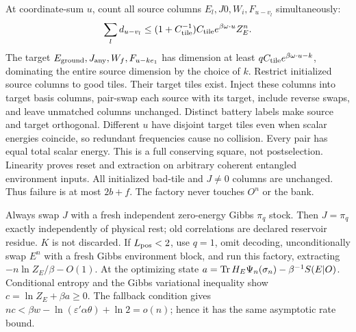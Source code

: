 At coordinate-sum $u$, count all source columns
$E_l,J0,W_i,F_{u-v_l}$ simultaneously:
\[
 \sum_l d_{u-v_l}
 \le(1+C_{\rm tile}^{-1})C_{\rm tile}e^{\beta\omega\cdot u}Z_E^n.
\]
The target $E_{\rm ground},J_{\rm any},W_f,F_{u-ke_1}$ has dimension
at least $qC_{\rm tile}e^{\beta\omega\cdot u-k}$, dominating the
entire source dimension by the choice of $k$.
Restrict initialized source columns to good tiles. Their target
tiles exist. Inject these columns into target basis columns,
pair-swap each source with its target, include reverse swaps, and
leave unmatched columns unchanged.
Distinct battery labels make source and target orthogonal.
Different $u$ have disjoint target tiles even when scalar energies
coincide, so redundant frequencies cause no collision.
Every pair has equal total scalar energy. This is a full conserving
square, not postselection. Linearity proves reset and extraction on
arbitrary coherent entangled environment inputs. All initialized
bad-tile and $J\ne0$ columns are unchanged. Thus failure is at most
$2b+f$. The factory never touches $O^n$ or the bank.

Always swap $J$ with a fresh independent zero-energy Gibbs $\pi_q$ stock.
Then $J=\pi_q$ exactly independently of physical rest; old correlations
are declared reservoir residue. $K$ is not discarded.
If $L_{\rm pos}<2$, use $q=1$, omit decoding, unconditionally swap
$E^n$ with a fresh Gibbs environment block, and run this factory,
extracting $-n\ln Z_E/\beta-O(1)$.
At the optimizing state
$a=\operatorname{Tr} H_E\Psi_n(\sigma_n)-\beta^{-1}S(E|O)$.
Conditional entropy and the Gibbs variational inequality show
$c=\ln Z_E+\beta a\ge0$. The fallback condition gives
$nc<\beta w-\ln(\varepsilon'\alpha\theta)+\ln2=o(n)$;
hence it has the same asymptotic rate bound.

